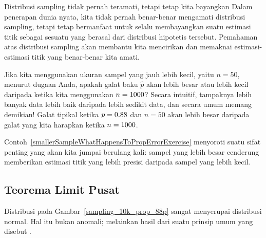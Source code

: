 \begin{onebox}{Distribusi sampling
    tidak pernah teramati, tetapi tetap kita bayangkan}
  Dalam penerapan dunia nyata, kita tidak pernah benar-benar mengamati
  distribusi sampling, tetapi tetap bermanfaat untuk selalu membayangkan
  suatu estimasi titik sebagai sesuatu yang berasal dari distribusi
  hipotetis tersebut.
  \mbox{Pemahaman} atas distribusi sampling akan membantu kita
  mencirikan dan memaknai estimasi-estimasi titik yang
  benar-benar kita amati.
\end{onebox}

\begin{examplewrap}
\begin{nexample}{Jika kita menggunakan ukuran sampel yang jauh lebih kecil, yaitu $n = 50$,
menurut dugaan Anda, apakah galat baku $\hat{p}$ akan lebih besar
atau lebih kecil daripada ketika kita menggunakan $n = 1000{}$?}
\label{smallerSampleWhatHappensToPropErrorExercise}
Secara intuitif, tampaknya lebih banyak data lebih baik
daripada lebih sedikit data, dan secara umum memang demikian! Galat tipikal
ketika $p = 0.88{}$ dan $n = 50$ akan lebih besar
daripada galat yang kita harapkan ketika $n = 1000{}$.
\end{nexample}
\end{examplewrap}

Contoh~\ref{smallerSampleWhatHappensToPropErrorExercise}
menyoroti suatu sifat penting yang akan kita jumpai berulang kali:
sampel yang lebih besar cenderung memberikan estimasi titik yang lebih presisi
daripada sampel yang lebih kecil.

\subsection{Teorema Limit Pusat}

Distribusi pada
Gambar~\ref{sampling_10k_prop_88p} sangat menyerupai
distribusi normal. Hal itu bukan anomali; melainkan hasil
dari suatu prinsip umum yang disebut
.

